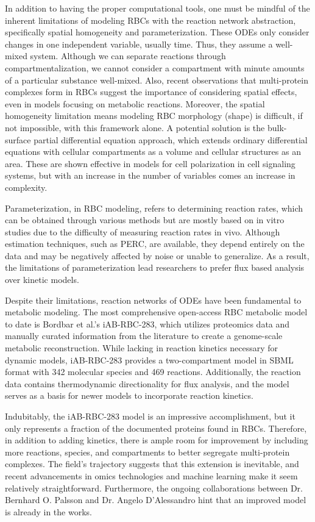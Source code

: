 \documentclass[conference]{IEEEtran}
\begin{document}
 In addition to having the proper computational tools, one must be mindful of the inherent limitations of modeling RBCs with the reaction network abstraction, specifically spatial homogeneity and parameterization. These ODEs only consider changes in one independent variable, usually time. Thus, they assume a well-mixed system. Although we can separate reactions through compartmentalization, we cannot consider a compartment with minute amounts of a particular substance well-mixed\cite{b4}. Also, recent observations that multi-protein complexes form in RBCs suggest the importance of considering spatial effects, even in models focusing on metabolic reactions\cite{b59, b60}. Moreover, the spatial homogeneity limitation means modeling RBC morphology (shape) is difficult, if not impossible, with this framework alone.  A potential solution is the bulk-surface partial differential equation approach, which extends ordinary differential equations with cellular compartments as a volume and cellular structures as an area. These are shown effective in models for cell polarization in cell signaling systems, but with an increase in the number of variables comes an increase in complexity\cite{b61}.
 
Parameterization, in RBC modeling, refers to determining reaction rates, which can be obtained through various methods but are mostly based on in vitro studies due to the difficulty of measuring reaction rates in vivo\cite{c1}. Although estimation techniques, such as PERC, are available, they depend entirely on the data and may be negatively affected by noise or unable to generalize. As a result, the limitations of parameterization lead researchers to prefer flux based analysis over kinetic models\cite{b62}.

 Despite their limitations, reaction networks of ODEs have been fundamental to metabolic modeling. The most comprehensive open-access RBC metabolic model to date is Bordbar et al.'s iAB-RBC-283, which utilizes proteomics data and manually curated information from the literature to create a genome-scale metabolic reconstruction\cite{b27}. While lacking in reaction kinetics necessary for dynamic models, iAB-RBC-283 provides a two-compartment model in SBML format with 342 molecular species and 469 reactions. Additionally, the reaction data contains thermodynamic directionality for flux analysis, and the model serves as a basis for newer models to incorporate reaction kinetics\cite{b29, b31}.

Indubitably, the iAB-RBC-283 model is an impressive accomplishment, but it only represents a fraction of the documented proteins found in RBCs\cite{b1, b60}. Therefore, in addition to adding kinetics, there is ample room for improvement by including more reactions, species, and compartments to better segregate multi-protein complexes. The field's trajectory suggests that this extension is inevitable, and recent advancements in omics technologies and machine learning make it seem relatively straightforward. Furthermore, the ongoing collaborations between Dr. Bernhard O. Palsson and Dr. Angelo D'Alessandro hint that an improved model is already in the works\cite{b63, b64, b65}.
\end{document}
